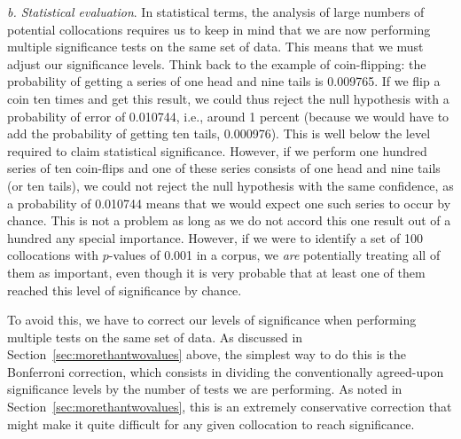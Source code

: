 \textit{b. Statistical evaluation}. In statistical terms, the analysis of large numbers of potential collocations  requires us to keep in mind that we are now performing multiple significance  tests on the same set of data. This means that we must adjust our significance levels. Think back to the example of coin\hyp{}flipping: the probability  of getting a series of one head and nine tails is 0.009765. If we flip a coin ten times and get this result, we could thus reject the null hypothesis  with a probability  of error of 0.010744, i.e., around 1 percent (because we would have to add the probability of getting ten tails, 0.000976). This is well below the level required to claim statistical significance. However, if we perform one hundred series of ten coin\hyp{}flips and one of these series consists of one head and nine tails (or ten tails), we could not reject the null hypothesis  with the same confidence, as a probability of 0.010744 means that we would expect one such series to occur by chance.  This is not a problem as long as we do not accord this one result out of a hundred any special importance. However, if we were to identify a set of 100 collocations  with $p$-values of 0.001 in a corpus, we \textit{are} potentially treating all of them as important, even though it is very probable that at least one of them reached this level of significance  by  chance.

To avoid this, we have to correct our levels of significance  when performing multiple tests on the same set of data. As discussed in Section~\ref{sec:morethantwovalues} above, the simplest way to do this is the Bonferroni  correction, which consists in dividing the conventionally agreed\hyp{}upon significance  levels by the number of tests we are performing. As noted in Section~\ref{sec:morethantwovalues}, this is an extremely conservative correction that might make it quite difficult for any given collocation  to reach significance.


